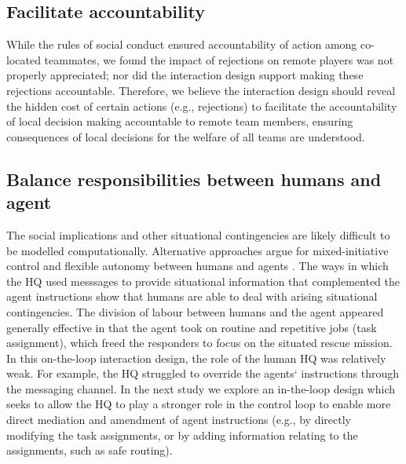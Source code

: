 \subsection{Facilitate accountability}
While the rules of social conduct ensured accountability of action among co-located teammates, we found the impact of rejections on remote players was not properly appreciated; nor did the interaction design support making these rejections accountable. Therefore, we believe the interaction design should reveal the hidden cost of certain actions (e.g., rejections) to facilitate the accountability of local decision making accountable to remote team members, ensuring consequences of local decisions for the welfare of all teams are understood. 

\subsection{Balance responsibilities between humans and agent}\label{sec:balanceResponsibility}
 The social implications and other situational contingencies are likely difficult to be modelled computationally. Alternative approaches argue for mixed-initiative  control and flexible autonomy between humans and agents \cite{Bradshaw2011}. The ways in which the HQ used messsages to provide situational information that complemented the agent instructions show that humans are able to deal with arising situational contingencies. The division of labour between humans and the agent appeared generally effective in that the agent took on routine and repetitive jobs (task assignment), which freed the responders to focus on the situated rescue mission. In this on-the-loop interaction design, the role of the human HQ was relatively weak. For example, the HQ struggled to override the agents` instructions through the messaging channel. In the next study we explore an in-the-loop design which seeks to allow the HQ to play a stronger role in the control loop to enable more direct mediation and amendment of agent instructions (e.g., by directly modifying the task assignments, or by adding information relating to the assignments, such as safe routing).
 


